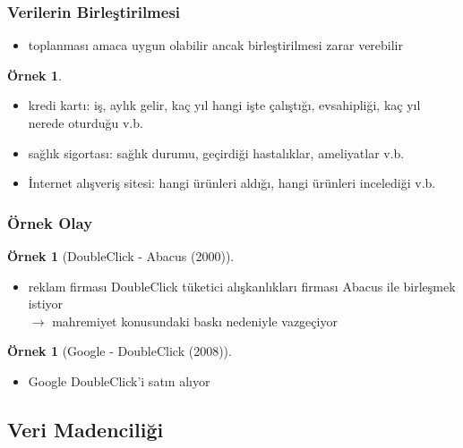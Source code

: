 \documentclass[dvipsnames]{beamer}
\theoremstyle{definition}
\theoremstyle{example}
\newtheorem{ornek}[theorem]{Örnek}
\theoremstyle{plain}
\begin{document}
\begin{frame}
  \frametitle{Verilerin Birleştirilmesi}

  \begin{itemize}
    \item toplanması amaca uygun olabilir ancak birleştirilmesi zarar verebilir
  \end{itemize}

  \begin{ornek}
    \begin{itemize}
      \item kredi kartı: iş, aylık gelir, kaç yıl hangi işte çalıştığı,
        evsahipliği, kaç yıl nerede oturduğu v.b.

      \item sağlık sigortası: sağlık durumu, geçirdiği hastalıklar, ameliyatlar
        v.b.

      \item İnternet alışveriş sitesi: hangi ürünleri aldığı, hangi ürünleri
        incelediği v.b.
    \end{itemize}
  \end{ornek}
\end{frame}

\begin{frame}
  \frametitle{Örnek Olay}

  \begin{ornek}[DoubleClick - Abacus (2000)]
    \begin{itemize}
      \item reklam firması DoubleClick tüketici alışkanlıkları firması Abacus
        ile birleşmek istiyor\\
        $\rightarrow$ mahremiyet konusundaki baskı nedeniyle vazgeçiyor
    \end{itemize}
  \end{ornek}

  \pause
  \begin{ornek}[Google - DoubleClick (2008)]
    \begin{itemize}
      \item Google DoubleClick'i satın alıyor
    \end{itemize}
  \end{ornek}
\end{frame}

\subsection{Veri Madenciliği}
\end{document}
